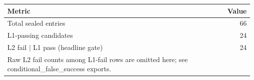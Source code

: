 \begin{tabular}{lr}
\hline
Metric & Value \\
\hline
Total sealed entries & 66 \\
L1-passing candidates & 24 \\
L2 fail $\mid$ L1 pass (headline gate) & 24 \\
\hline
\multicolumn{2}{l}{\footnotesize Raw L2 fail counts among L1-fail rows are omitted here; see conditional\_false\_success exports.} \\
\hline
\end{tabular}
